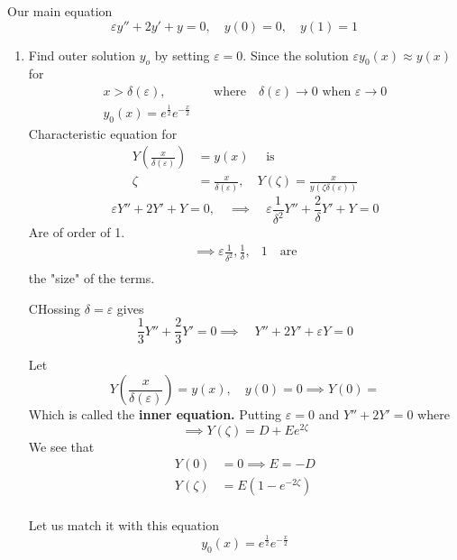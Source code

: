 \documentclass{article}
\theoremstyle{remark}
\newcommand{\newpara}
  {
  \vskip 0.4cm
  }
\begin{document}
Our main equation \[
\varepsilon y''  + 2 y'   + y = 0, \quad  y\left( 0 \right) = 0,  \quad    y\left( 1 \right) = 1
\] 
\begin{enumerate}[label=(\roman*)]
  \item Find outer solution $y_{o}$ by setting $\varepsilon  = 0$. Since the solution $\varepsilon y_{0}\left( x \right) \approx y\left( x \right)$ for \[
      \begin{split}
  x > \delta \left( \varepsilon  \right), &  \quad \text{where}\quad \delta \left( \varepsilon  \right) \to 0 \text{ when } \varepsilon \to 0   \\
 y_{0}\left( x \right) = e ^{\frac{1}{2}} e^{-\frac{x}{2}} 
      \end{split} 
  \] 
  Characteristic equation for \[
    \begin{split}
  Y\left( \frac{x}{\delta \left( \varepsilon  \right)} \right) &= y\left( x \right) \quad \text{ is}  \\
  \zeta   & = \frac{x}{\delta \left( \varepsilon  \right)},    \quad  Y\left( \zeta  \right) = \frac{x}{y\left( \zeta \delta \left( \varepsilon  \right) \right)}
    \end{split} 
  \] 
  \[
  \varepsilon Y'' + 2 Y'  + Y = 0, \quad  \implies  \quad  \varepsilon \frac{1}{\delta ^2} Y''  + \frac{2}{\delta } Y' + Y =0  
  \] 
  Are of order of 1. \[
  \begin{split}
    \implies  \varepsilon \frac{1}{\delta ^2} , \frac{1}{\delta },  & 1 \quad \text{are} \\
  \end{split} 
  \] 
  the "size" of the terms. 
  
  \newpara
  CHossing $\delta =\varepsilon $ gives \[
  \frac{1}{3} Y'' + \frac{2}{3} Y'  = 0 \implies \quad  Y'' + 2Y'  + \varepsilon Y = 0
  \] 

\newpara
Let \[
Y\left( \frac{x}{\delta \left( \varepsilon  \right)} \right) = y\left( x \right), \quad y\left( 0 \right) = 0 \implies  Y\left( 0 \right) =  
\] 
  Which is called the \textbf{inner equation.} 
Putting $ \varepsilon  = 0$ and $Y'' + 2 Y'  = 0$ where \[
\implies  Y\left( \zeta  \right) = D + E e ^{2\zeta }
\] 
We see that \[
\begin{split}
Y\left( 0 \right)  & = 0 \implies  E = -D \\
Y\left( \zeta  \right) &= E\left( 1- e^{-2\zeta } \right) \\
\end{split} 
\] 

Let us match it with this equation \[
y_{0}\left( x \right) = e^{\frac{1}{2}} e^{-\frac{x}{2}}
\] 


\end{enumerate}
\end{document}
